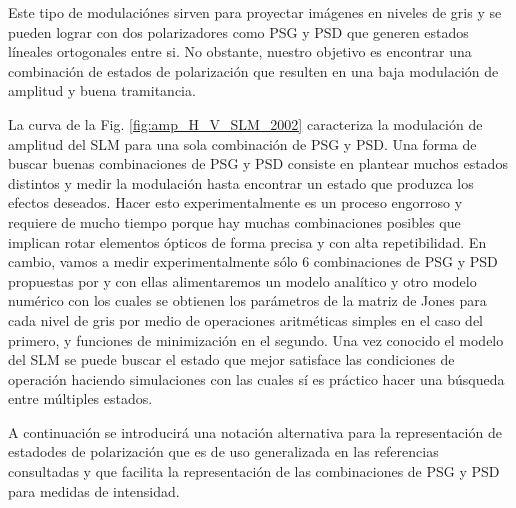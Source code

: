 Este tipo de modulaciónes
sirven para proyectar imágenes en niveles de gris y se pueden lograr
con dos polarizadores como PSG y PSD que generen estados líneales ortogonales
entre si.
No obstante, nuestro objetivo es encontrar una combinación de estados
de polarización que resulten en una baja modulación de amplitud y
buena tramitancia. 

La curva de la Fig. \ref{fig:amp_H_V_SLM_2002} caracteriza la modulación de amplitud del SLM para
una sola combinación de PSG y PSD. Una forma de buscar buenas
combinaciones de PSG y PSD consiste en plantear muchos estados
distintos y medir la modulación hasta encontrar un estado que produzca
los efectos deseados. Hacer esto experimentalmente es un proceso
engorroso y requiere de mucho tiempo porque hay muchas combinaciones
posibles que implican rotar elementos ópticos de forma precisa y con
alta repetibilidad. 
En cambio, vamos a medir experimentalmente sólo 6 combinaciones de PSG
y PSD propuestas por  y con
ellas alimentaremos un modelo analítico y otro modelo numérico con los
cuales se obtienen los parámetros de la matriz de 
Jones para cada nivel de gris por medio de operaciones aritméticas
simples en el caso del primero, y funciones de minimización en el segundo.
Una vez conocido el modelo del SLM se puede buscar el
estado que mejor satisface las condiciones de operación haciendo simulaciones con
las cuales sí es práctico hacer una búsqueda entre múltiples estados.

A continuación se introducirá una notación alternativa para la
representación de estadodes de polarización que es de uso generalizada
en las referencias consultadas y que facilita la
representación de las combinaciones de PSG y PSD para medidas de
intensidad.  


